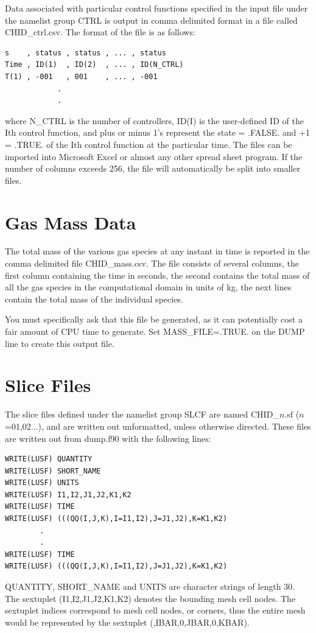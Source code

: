 \documentclass[11pt]{book}
\begin{document}
Data associated with particular control functions specified in the input file under the namelist group {\ct CTRL} is output in comma delimited format in a file called {\ct CHID\_ctrl.csv}. The format of the file is as follows:
\begin{lstlisting}
s    , status , status , ... , status
Time , ID(1)  , ID(2)  , ... , ID(N_CTRL)
T(1) , -001   , 001    , ... , -001
            .
            .
\end{lstlisting}
where {\ct N\_CTRL} is the number of controllers, {\ct ID(I)} is the user-defined ID of the {\ct I}th control function, and plus or minus 1's represent the state { = .FALSE. and +1 = .TRUE.} of the {\ct I}th control function at the particular time. The files can be imported into Microsoft Excel or almost any other spread sheet program. If the number of columns exceeds 256, the file will automatically be split into smaller files.


\section{Gas Mass Data}

The total mass of the various gas species at any instant in time is reported in the comma delimited file {\ct CHID\_mass.csv}. The file consists of several columns, the first column containing the time in seconds, the second contains the total mass of all the gas species in the computational domain in units of kg, the next lines contain the total mass of the individual species.

You must specifically ask that this file be generated, as it can potentially cost a fair amount of CPU time to generate. Set {\ct MASS\_FILE=.TRUE.} on the {\ct DUMP} line to create this output file.


\section{Slice Files}
\label{out:SLCF}

The slice files defined under the namelist group {\ct SLCF} are named {\ct CHID\_$n$.sf} ($n$=01,02...), and are written out unformatted, unless otherwise directed. These files are written out from {\ct dump.f90} with the following lines:
\begin{lstlisting}
WRITE(LUSF) QUANTITY
WRITE(LUSF) SHORT_NAME
WRITE(LUSF) UNITS
WRITE(LUSF) I1,I2,J1,J2,K1,K2
WRITE(LUSF) TIME
WRITE(LUSF) (((QQ(I,J,K),I=I1,I2),J=J1,J2),K=K1,K2)
        .
        .
WRITE(LUSF) TIME
WRITE(LUSF) (((QQ(I,J,K),I=I1,I2),J=J1,J2),K=K1,K2)
\end{lstlisting}
{\ct QUANTITY}, {\ct SHORT\_NAME} and {\ct UNITS} are character strings of length 30. The sextuplet ({\ct I1,I2,J1,J2,K1,K2}) denotes the bounding mesh cell nodes. The sextuplet indices correspond to mesh cell nodes, or corners, thus the entire mesh would be represented by the sextuplet ({,IBAR,0,JBAR,0,KBAR}).
\end{document}
